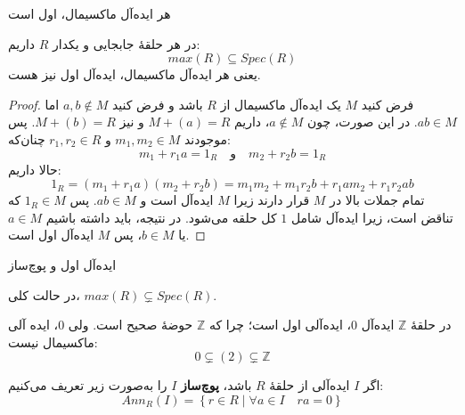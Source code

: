 \begin{frame}[t]{هر ایده‌آل ماکسیمال، اول است}
    \setlength{\abovedisplayskip}{3pt}
    \setlength{\belowdisplayskip}{3pt}
    \begin{theorem}
        در هر حلقهٔ جابجایی و یکدار $R$ داریم:
        \[
            max(R) \subseteq Spec(R)
        \]
        یعنی هر ایده‌آل ماکسیمال، ایده‌آل اول نیز هست.
    \end{theorem}

    \begin{proof}
        فرض کنید $M$ یک ایده‌آل ماکسیمال از $R$ باشد و فرض کنید $a, b \notin M$ اما $ab \in M$.
        در این صورت، چون $a \notin M$، داریم $M + (a) = R$ و نیز $M + (b) = R$.
        پس موجودند $m_1, m_2 \in M$ و $r_1, r_2 \in R$ چنان‌که:
        \[
            m_1 + r_1 a = 1_R \quad \text{و} \quad m_2 + r_2 b = 1_R
        \]
        حالا داریم:
        \[
            1_R = (m_1 + r_1 a)(m_2 + r_2 b) = m_1 m_2 + m_1 r_2 b + r_1 a m_2 + r_1 r_2 ab
        \]
        تمام جملات بالا در $M$ قرار دارند زیرا $M$ ایده‌آل است و $ab \in M$.
        پس $1_R \in M$ که تناقض است، زیرا ایده‌آل شامل $1$ کل حلقه می‌شود.
        در نتیجه، باید داشته باشیم $a \in M$ یا $b \in M$، پس $M$ ایده‌آل اول است.
    \end{proof}

\end{frame}

\begin{frame}[t]{ایده‌آل اول و پوچ‌ساز}

    \begin{remark}
        در حالت کلی، $max(R) \subsetneq Spec(R)$.


    \end{remark}

    \begin{example}
        در حلقهٔ
        \(\mathbb{Z}\)
        ایده‌آل
        \(0\)،
        ایده‌‌آلی اول است؛ چرا که
        \(\mathbb{Z}\)
        حوضهٔ صحیح است.
        ولی
        \(0\)،
        ایده آلی ماکسیمال نیست:
        \[
            0 \subsetneq (2) \subsetneq \mathbb{Z}
        \]
    \end{example}

    \begin{definition}
        اگر $I$ ایده‌آلی از حلقهٔ $R$ باشد، \textbf{پوچ‌ساز} $I$ را به‌صورت زیر تعریف می‌کنیم:
        \[
            Ann_R(I) = \left\{ r \in R \mid \forall a \in I \quad ra = 0 \right\}
        \]
    \end{definition}

\end{frame}


